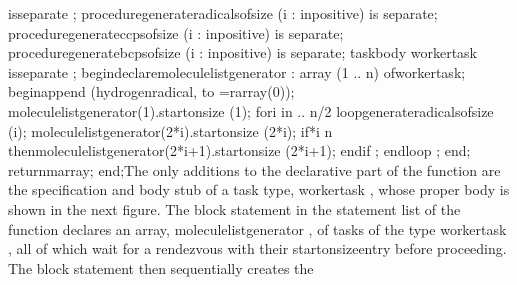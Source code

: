 \tyxtstxbf[]is\tyxtstxendbf[] \tyxtstxbf[]separate%
\tyxtstxendbf[];
   \tyxtstxbf[]procedure\tyxtstxendbf[] generate\Symuns[]radicals\Symuns[]of\Symuns[]size (i : %
\tyxtstxbf[]in\tyxtstxendbf[] positive) \tyxtstxbf[]is%
\tyxtstxendbf[] \tyxtstxbf[]separate\tyxtstxendbf[];
   \tyxtstxbf[]procedure\tyxtstxendbf[] generate\Symuns[]ccps\Symuns[]of\Symuns[]size     (i : %
\tyxtstxbf[]in\tyxtstxendbf[] positive) \tyxtstxbf[]is%
\tyxtstxendbf[] \tyxtstxbf[]separate\tyxtstxendbf[];
   \tyxtstxbf[]procedure\tyxtstxendbf[] generate\Symuns[]bcps\Symuns[]of\Symuns[]size     (i : %
\tyxtstxbf[]in\tyxtstxendbf[] positive) \tyxtstxbf[]is%
\tyxtstxendbf[] \tyxtstxbf[]separate\tyxtstxendbf[];
   \tyxtstxbf[]task\tyxtstxendbf[] \tyxtstxbf[]body%
\tyxtstxendbf[] worker\Symuns[]task                                 %
\tyxtstxbf[]is\tyxtstxendbf[] \tyxtstxbf[]separate%
\tyxtstxendbf[];
\tyxtstxbf[]begin\tyxtstxendbf[]
   \tyxtstxbf[]declare\tyxtstxendbf[]
      molecule\Symuns[]list\Symuns[]generator : \tyxtstxbf[]array%
\tyxtstxendbf[] (1 .. n) \tyxtstxbf[]of\tyxtstxendbf[] worker\Symuns[]task;
   \tyxtstxbf[]begin\tyxtstxendbf[]
      append (hydrogen\Symuns[]radical, to =\Symgt[] r\Symuns[]array(0));
      molecule\Symuns[]list\Symuns[]generator(1).start\Symuns[]on\Symuns[]size (1);
      \tyxtstxbf[]for\tyxtstxendbf[] i \tyxtstxbf[]in%
 .. n/2 \tyxtstxbf[]loop\tyxtstxendbf[]
         generate\Symuns[]radicals\Symuns[]of\Symuns[]size (i);
         molecule\Symuns[]list\Symuns[]generator(2*i).start\Symuns[]on\Symuns[]size (2*i);
         \tyxtstxbf[]if*i \Symlt[] n %
\tyxtstxbf[]then\tyxtstxendbf[]
            molecule\Symuns[]list\Symuns[]generator(2*i+1).start\Symuns[]on\Symuns[]size (2*i+1);
         \tyxtstxbf[]end\tyxtstxendbf[] \tyxtstxbf[]if%
\tyxtstxendbf[];
      \tyxtstxbf[]end\tyxtstxendbf[] \tyxtstxbf[]loop%
\tyxtstxendbf[];
   \tyxtstxbf[]end\tyxtstxendbf[];
   \tyxtstxbf[]return\tyxtstxendbf[] m\Symuns[]array;
\tyxtstxbf[]end\tyxtstxendbf[];\Endcomp[]
\EndParbox[]
\FgEndblock[]
 The only additions to the declarative part of the function are the
specification and body stub of a task type, \tyxffmxmono[]worker\Symuns[]task%
\tyxffmxendmono[], whose proper body is shown in the next figure.
The block statement in the statement list of the function declares
an array, \tyxffmxmono[]molecule\Symuns[]list\Symuns[]generator%
\tyxffmxendmono[], of tasks of the type \tyxffmxmono[]worker\Symuns[]task%
\tyxffmxendmono[], all of which wait for a rendezvous with their %
\tyxffmxmono[]start\Symuns[]on\Symuns[]size\tyxffmxendmono[] entry
before proceeding. The block statement then sequentially creates the
